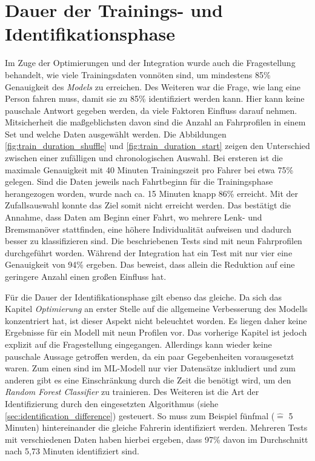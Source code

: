 \section{Dauer der Trainings- und Identifikationsphase}

Im Zuge der Optimierungen und der Integration wurde auch die Fragestellung behandelt, wie viele Trainingsdaten vonnöten sind, um mindestens 85\% Genauigkeit des \textit{Models} zu erreichen. Des Weiteren war die Frage, wie lang eine Person fahren muss, damit sie zu 85\% identifiziert werden kann. Hier kann keine pauschale Antwort gegeben werden, da viele Faktoren Einfluss darauf nehmen. Mitsicherheit die maßgeblichsten davon sind die Anzahl an Fahrprofilen in einem Set und welche Daten ausgewählt werden. Die Abbildungen \ref{fig:train_duration_shuffle} und \ref{fig:train_duration_start} zeigen den Unterschied zwischen einer zufälligen und chronologischen Auswahl. Bei ersteren ist die maximale Genauigkeit mit 40 Minuten Trainingszeit pro Fahrer bei etwa 75\% gelegen. Sind die Daten jeweils nach Fahrtbeginn für die Trainingsphase herangezogen worden, wurde nach ca. 15 Minuten knapp 86\% erreicht. Mit der Zufallsauswahl konnte das Ziel somit nicht erreicht werden. Das bestätigt die Annahme, dass Daten am Beginn einer Fahrt, wo mehrere Lenk- und Bremsmanöver stattfinden, eine höhere Individualität aufweisen und dadurch besser zu klassifizieren sind. Die beschriebenen Tests sind mit neun Fahrprofilen durchgeführt worden. Während der Integration hat ein Test mit nur vier eine Genauigkeit von 94\% ergeben. Das beweist, dass allein die Reduktion auf eine geringere Anzahl einen großen Einfluss hat.

Für die Dauer der Identifikationsphase gilt ebenso das gleiche. Da sich das Kapitel \textit{Optimierung} an erster Stelle auf die allgemeine Verbesserung des Modells konzentriert hat, ist dieser Aspekt nicht beleuchtet worden. Es liegen daher keine Ergebnisse für ein Modell mit neun Profilen vor. Das vorherige Kapitel ist jedoch explizit auf die Fragestellung eingegangen. Allerdings kann wieder keine pauschale Aussage getroffen werden, da ein paar Gegebenheiten vorausgesetzt waren. Zum einen sind im ML-Modell nur vier Datensätze inkludiert und zum anderen gibt es eine Einschränkung durch die Zeit die benötigt wird, um den \textit{Random Forest Classifier} zu trainieren. Des Weiteren ist die Art der Identifizierung durch den eingesetzten Algorithmus (siehe \ref{sec:identification_difference}) gesteuert. So muss zum Beispiel fünfmal ($\widehat{=}$ 5 Minuten) hintereinander die gleiche Fahrerin identifiziert werden. Mehreren Tests mit verschiedenen Daten haben hierbei ergeben, dass 97\% davon im Durchschnitt nach 5,73 Minuten identifiziert sind.

